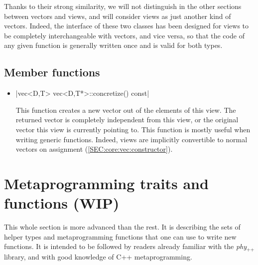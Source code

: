 \documentclass[12pt]{report}
\newcommand{\phypp}{\textit{phy}$_{\text{++}}$\xspace}
\newenvironment{warning}
{
    \begin{mdframed}[style=warning,frametitle={Warning}]
}
{
    \end{mdframed}
}
\begin{document}
Thanks to their strong similarity, we will not distinguish in the other sections between vectors and views, and will consider views as just another kind of vectors. Indeed, the interface of these two classes has been designed for views to be completely interchangeable with vectors, and vice versa, so that the code of any given function is generally written once and is valid for both types.

\subsection{Member functions \label{SEC:core:view:member_fun}}

\begin{itemize}
\item \cppinline|vec<D,T> vec<D,T*>::concretize() const|

This function creates a new vector out of the elements of this view. The returned vector is completely independent from this view, or the original vector this view is currently pointing to. This function is mostly useful when writing generic functions. Indeed, views are implicitly convertible to normal vectors on assignment (\ref{SEC:core:vec:constructor}).
\end{itemize}

\section{Metaprogramming traits and functions (WIP) \label{SEC:core:meta}}

\begin{warning}
This whole section is more advanced than the rest. It is describing the sets of helper types and metaprogramming functions that one can use to write new functions. It is intended to be followed by readers already familiar with the \phypp library, and with good knowledge of C++ metaprogramming.
\end{warning}















\end{document}

